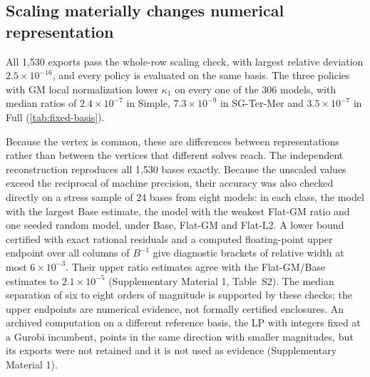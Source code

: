 \documentclass[11pt]{article}
\theoremstyle{definition}
\theoremstyle{remark}
\begin{document}
\subsection{Scaling materially changes numerical representation}
\label{subsec:results-fixed-basis}
All 1,530 exports pass the whole-row scaling check, with largest relative deviation
$2.5\times10^{-16}$, and every policy is evaluated on the same basis. The three policies with GM
local normalization lower $\kappa_1$ on every one of the 306 models, with median ratios of
$2.4\times10^{-7}$ in Simple, $7.3\times10^{-9}$ in SG-Ter-Mer and $3.5\times10^{-7}$ in Full
(\cref{tab:fixed-basis}).
\begin{table}[tb]
\centering\small
\caption{Fixed-basis conditioning audit on all 306 dispatch models. One optimal basis of the
Base LP relaxation is assembled from every policy's own export. The first row is the median
$\kappa_1$ of the Base basis; the others give the median per-instance ratio
$\kappa_1(\text{policy})/\kappa_1(\text{Base})$ and, in parentheses, the number of instances
with a ratio below one. Ranges are in Supplementary Material 1, Table~S1.}
\label{tab:fixed-basis}

\end{table} Because the vertex is common, these are differences between
representations rather than between the vertices that different solves reach. The independent
reconstruction reproduces all 1,530 bases exactly. Because the unscaled values exceed the
reciprocal of machine precision, their accuracy was also checked directly on a stress sample of
24 bases from eight models: in each class, the model with the largest Base estimate, the model
with the weakest Flat-GM ratio and one seeded random model, under Base, Flat-GM and Flat-L2. A
lower bound certified with exact rational residuals and a computed floating-point upper
endpoint over all columns of $B^{-1}$ give diagnostic brackets of relative width at most
$6\times10^{-3}$. Their upper ratio estimates agree with the Flat-GM/Base estimates to
$2.1\times10^{-5}$ (Supplementary Material 1, Table~S2). The median separation of six to eight orders
of magnitude is supported by these checks; the upper endpoints are numerical evidence,
not formally certified enclosures.
An archived computation on a different reference basis, the LP with integers fixed at a Gurobi
incumbent, points in the same direction with smaller magnitudes, but its exports were not
retained and it is not used as evidence (Supplementary Material 1).
\end{document}
